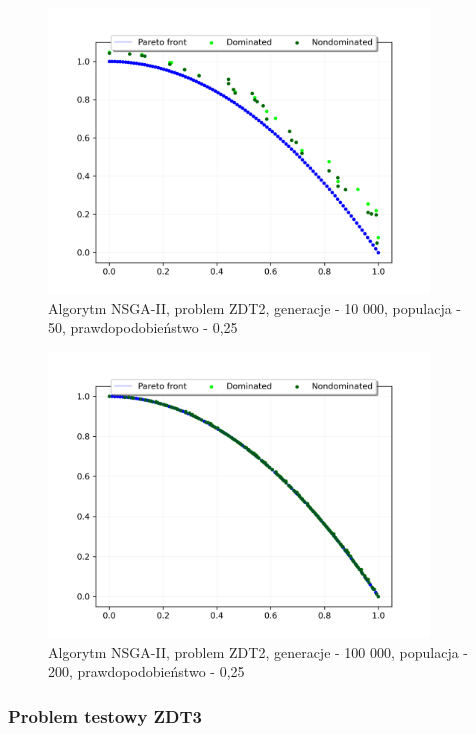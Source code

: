 \documentclass{classrep}
\begin{document}
\begin{figure}[H]
    \centering
    \includegraphics[width=0.9\textwidth]{img2/NSGAII_ZDT2_g10000_p50_r0,25.png}
    \caption{Algorytm NSGA-II, problem ZDT2, \newline generacje - 10 000, populacja - 50, prawdopodobieństwo - 0,25}
\end{figure}

\begin{figure}[H]
    \centering
    \includegraphics[width=0.9\textwidth]{img2/NSGAII_ZDT2_g100000_p200_r0,25.png}
    \caption{Algorytm NSGA-II, problem ZDT2, \newline generacje - 100 000, populacja - 200, prawdopodobieństwo - 0,25}
\end{figure}

\subsubsection{Problem testowy ZDT3}
\end{document}
